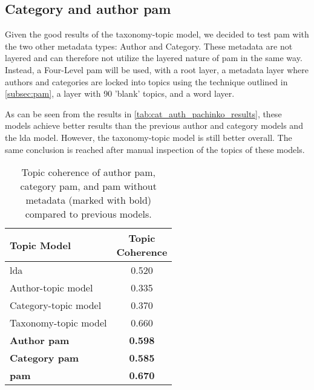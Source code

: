 \subsection{Category and author \gls{pam}}\label{app:cat_auth_pachinko}
Given the good results of the taxonomy-topic model, we decided to test \gls{pam} with the two other metadata types: Author and Category.
These metadata are not layered and can therefore not utilize the layered nature of \gls{pam} in the same way.
Instead, a Four-Level \gls{pam} will be used, with a root layer, a metadata layer where authors and categories are locked into topics using the technique outlined in \autoref{subsec:pam}, a layer with 90 'blank' topics, and a word layer.

As can be seen from the results in \autoref{tab:cat_auth_pachinko_results}, these models achieve better results than the previous author and category models and the \gls{lda} model.
However, the taxonomy-topic model is still better overall.
The same conclusion is reached after manual inspection of the topics of these models.

\begin{table}[h]
	\centering
	\caption{Topic coherence of author \gls{pam}, category \gls{pam}, and \gls{pam} without metadata (marked with bold) compared to previous models.}
	\begin{tabular}{l|c}
		Topic Model & \makecell{Topic \\ Coherence} \\
		\midrule
		\Acrlong{lda} & 0.520 \\
		Author-topic model & 0.335 \\
		Category-topic model & 0.370 \\
		Taxonomy-topic model & 0.660 \\
		\textbf{Author \gls{pam}} & \textbf{0.598} \\
		\textbf{Category \gls{pam}} & \textbf{0.585} \\
		\textbf{\Acrlong{pam}} & \textbf{0.670} \\
	\end{tabular}
	\label{tab:cat_auth_pachinko_results}
\end{table}

